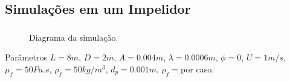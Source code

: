 \documentclass{beamer}
\begin{document}
\subsection*{Simulações em um Impelidor}
\begin{frame}
  \frametitle{\subsecname}
  
  \vspace*{-\baselineskip}\setlength\belowdisplayshortskip{0pt} %
  \begin{figure}
     {\raggedleft \tiny Diagrama da simulação.}
  \end{figure}
  \vspace*{-\baselineskip}\setlength\belowdisplayshortskip{0pt} %
  \begin{block}{Parâmetros}
    $L=8m$, $D=2m$, $A=0.004m$, $\lambda=0.0006m$, $\phi=0$, $U=1m/s$, $\mu_f=50Pa.s$, $\rho_f=50kg/m^3$, $d_p=0.001m$, $\rho_f=$por caso.
  \end{block}
\end{frame}
\end{document}
